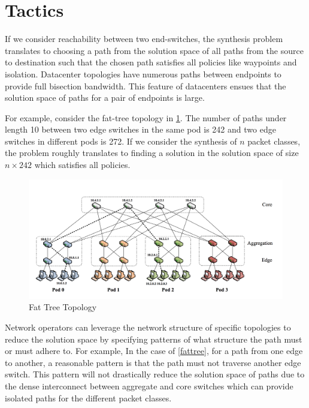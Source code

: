 \section{Tactics} \label{sec:tactic}
If we consider reachability between two end-switches, the synthesis problem translates to choosing a path from the solution space of all paths from the source to destination such that the chosen path satisfies all policies like waypoints and isolation. Datacenter topologies have numerous paths between endpoints to provide full bisection bandwidth. This feature of datacenters ensues that the solution space of paths for a pair of endpoints is large. 

For example, consider the fat-tree topology in \cref{fig:fattree}. The number of paths under length 10 between two edge  switches in the same pod is 242 and two edge switches in different pods is 272. If we consider the synthesis of $n$ packet classes, the problem roughly translates to finding a solution in the solution space of size $n \times 242$ which satisfies all policies. 
\begin{figure}[H]
	\includegraphics[width=\columnwidth]{fattree.png}
	\caption{Fat Tree Topology}
	\label{fig:fattree}
\end{figure}
Network operators can leverage the network structure of specific topologies to reduce the solution space by specifying patterns of what structure the path must or must adhere to. For example, In the case of \cref{fattree}, for a path from one edge to another, a reasonable pattern is that the path must not traverse another edge switch. This pattern will not drastically reduce the solution space of paths due to the dense interconnect between aggregate and core switches which can provide isolated paths for the different packet classes. 

